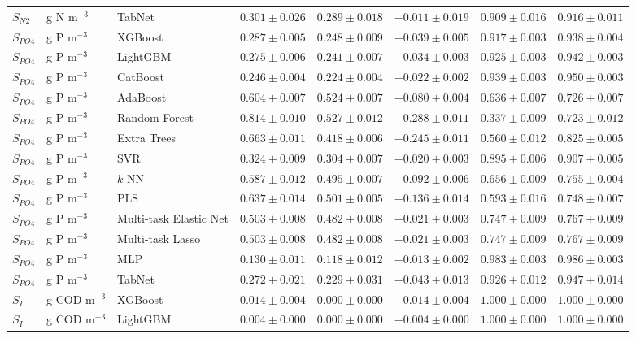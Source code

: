 \begin{longtable}{llp{3.1cm}rrrrr}
$S_{N2}$ & g N m$^{-3}$ & TabNet & $0.301\pm0.026$ & $0.289\pm0.018$ & $-0.011\pm0.019$ & $0.909\pm0.016$ & $0.916\pm0.011$ \\
$S_{PO4}$ & g P m$^{-3}$ & XGBoost & $0.287\pm0.005$ & $0.248\pm0.009$ & $-0.039\pm0.005$ & $0.917\pm0.003$ & $0.938\pm0.004$ \\
$S_{PO4}$ & g P m$^{-3}$ & LightGBM & $0.275\pm0.006$ & $0.241\pm0.007$ & $-0.034\pm0.003$ & $0.925\pm0.003$ & $0.942\pm0.003$ \\
$S_{PO4}$ & g P m$^{-3}$ & CatBoost & $0.246\pm0.004$ & $0.224\pm0.004$ & $-0.022\pm0.002$ & $0.939\pm0.003$ & $0.950\pm0.003$ \\
$S_{PO4}$ & g P m$^{-3}$ & AdaBoost & $0.604\pm0.007$ & $0.524\pm0.007$ & $-0.080\pm0.004$ & $0.636\pm0.007$ & $0.726\pm0.007$ \\
$S_{PO4}$ & g P m$^{-3}$ & Random Forest & $0.814\pm0.010$ & $0.527\pm0.012$ & $-0.288\pm0.011$ & $0.337\pm0.009$ & $0.723\pm0.012$ \\
$S_{PO4}$ & g P m$^{-3}$ & Extra Trees & $0.663\pm0.011$ & $0.418\pm0.006$ & $-0.245\pm0.011$ & $0.560\pm0.012$ & $0.825\pm0.005$ \\
$S_{PO4}$ & g P m$^{-3}$ & SVR & $0.324\pm0.009$ & $0.304\pm0.007$ & $-0.020\pm0.003$ & $0.895\pm0.006$ & $0.907\pm0.005$ \\
$S_{PO4}$ & g P m$^{-3}$ & $k$-NN & $0.587\pm0.012$ & $0.495\pm0.007$ & $-0.092\pm0.006$ & $0.656\pm0.009$ & $0.755\pm0.004$ \\
$S_{PO4}$ & g P m$^{-3}$ & PLS & $0.637\pm0.014$ & $0.501\pm0.005$ & $-0.136\pm0.014$ & $0.593\pm0.016$ & $0.748\pm0.007$ \\
$S_{PO4}$ & g P m$^{-3}$ & Multi-task Elastic Net & $0.503\pm0.008$ & $0.482\pm0.008$ & $-0.021\pm0.003$ & $0.747\pm0.009$ & $0.767\pm0.009$ \\
$S_{PO4}$ & g P m$^{-3}$ & Multi-task Lasso & $0.503\pm0.008$ & $0.482\pm0.008$ & $-0.021\pm0.003$ & $0.747\pm0.009$ & $0.767\pm0.009$ \\
$S_{PO4}$ & g P m$^{-3}$ & MLP & $0.130\pm0.011$ & $0.118\pm0.012$ & $-0.013\pm0.002$ & $0.983\pm0.003$ & $0.986\pm0.003$ \\
$S_{PO4}$ & g P m$^{-3}$ & TabNet & $0.272\pm0.021$ & $0.229\pm0.031$ & $-0.043\pm0.013$ & $0.926\pm0.012$ & $0.947\pm0.014$ \\
$S_{I}$ & g COD m$^{-3}$ & XGBoost & $0.014\pm0.004$ & $0.000\pm0.000$ & $-0.014\pm0.004$ & $1.000\pm0.000$ & $1.000\pm0.000$ \\
$S_{I}$ & g COD m$^{-3}$ & LightGBM & $0.004\pm0.000$ & $0.000\pm0.000$ & $-0.004\pm0.000$ & $1.000\pm0.000$ & $1.000\pm0.000$ \\

\end{longtable}
